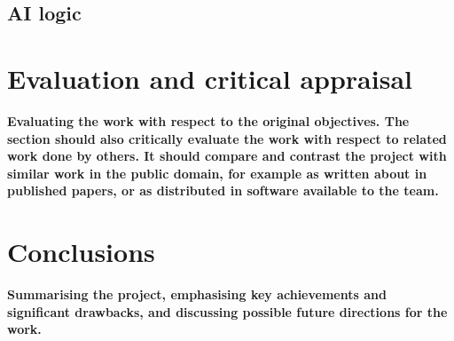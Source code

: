 \documentclass[a4paper,doc,draftfirst]{apa6}
\begin{document}
\subsection{AI logic}

\lipsum[80-85]

\section{Evaluation and critical appraisal}
\textbf{Evaluating the work with respect to the original objectives. The section should also critically evaluate the work with respect to related work done by others. It should compare and contrast the project with similar work in the public domain, for example as written about in published papers, or as distributed in software available to the team.}

\lipsum[31-45]




\section{Conclusions}
\textbf{Summarising the project, emphasising key achievements and significant drawbacks, and discussing possible future directions for the work.}

\lipsum[46-55]
\end{document}
